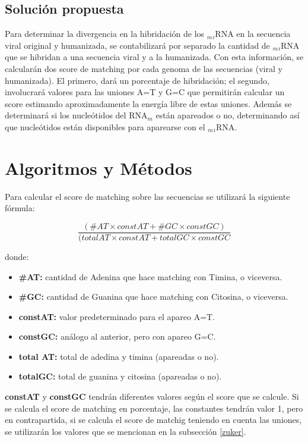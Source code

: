 \documentclass[12pt,a4paper,spanish]{article}
\begin{document}
	\subsection{Solución propuesta}
		\par Para determinar la divergencia en la hibridación de los $_m$$_i$RNA en la secuencia viral original y 			humanizada, se contabilizará por separado la cantidad de $_m$$_i$RNA que se hibridan a una secuencia viral y a la 			humanizada. Con esta información, se calcularán dos score de matching por cada genoma de las secuencias (viral y 			humanizada). El primero, dará un porcentaje de hibridación; el segundo, involucrará valores para las uniones 			\textsc{A=T} y \textsc{G=C} que permitirán calcular un score estimando aproximadamente la energía libre de estas 			uniones. Además se determinará si los nucleótidos del RNA$_m$ están apareados o no, determinando así que 			nucleótidos están disponibles para aparearse con el $_m$$_i$RNA.

\section{Algoritmos y Métodos}
	\par Para calcular el score de matching sobre las secuencias se utilizará la siguiente fórmula:

		\begin{equation}	
			\frac{(\#AT \times constAT + \#GC \times constGC)}{(totalAT \times constAT + totalGC \times constGC}
		\end{equation}	

		\par donde:
		\begin{itemize}
			\item \textbf{\#AT:} cantidad de Adenina que hace matching con Timina, o viceversa.
			\item \textbf{\#GC:} cantidad de Guanina que hace matching con Citosina, o viceversa.
			\item \textbf{constAT:} valor predeterminado para el apareo A=T.
			\item \textbf{constGC:} análogo al anterior, pero con apareo G=C.
			\item \textbf{total AT:} total de adedina y timina (apareadas o no).
			\item \textbf{totalGC:} total de guanina y citosina (apareadas o no).	
		\end{itemize}

	\par \textbf{constAT} y \textbf{constGC} tendrán diferentes valores según el score que se calcule. Si se calcula el 	score de matching en porcentaje, las constantes tendrán valor 1, pero en contrapartida, si se calcula el score de 		matchig teniendo en cuenta las uniones, se utilizarán los valores que se mencionan en la subsección \ref{zuker}.
\end{document}
